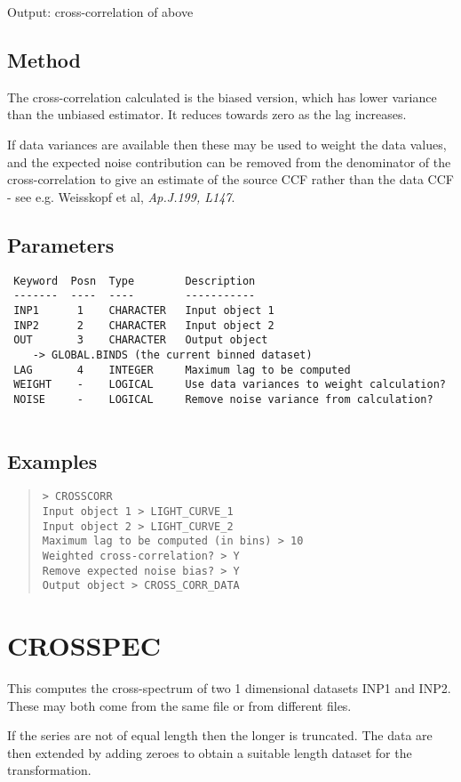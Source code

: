 \documentclass{book}
\renewcommand{\_}{{\tt\char'137}}     %
\begin{document}
Output: cross-correlation of above
 
\subsection{Method}
The cross-correlation calculated is the biased version, which has
lower variance than the unbiased estimator. It reduces towards
zero as the lag increases.
 
If data variances are available then these may be used to weight
the data values, and the expected noise contribution can be
removed from the denominator of the cross-correlation to give an
estimate of the source CCF rather than the data CCF - see e.g.
Weisskopf et al, {\em Ap.J.199, L147}.
\subsection{Parameters}
\begin{verbatim}
 Keyword  Posn  Type        Description
 -------  ----  ----        -----------
 INP1      1    CHARACTER   Input object 1
 INP2      2    CHARACTER   Input object 2
 OUT       3    CHARACTER   Output object
    -> GLOBAL.BINDS (the current binned dataset)
 LAG       4    INTEGER     Maximum lag to be computed
 WEIGHT    -    LOGICAL     Use data variances to weight calculation?
 NOISE     -    LOGICAL     Remove noise variance from calculation?
 
\end{verbatim}\subsection{Examples}
\begin{quote}\begin{verbatim}
> CROSSCORR
Input object 1 > LIGHT_CURVE_1
Input object 2 > LIGHT_CURVE_2
Maximum lag to be computed (in bins) > 10
Weighted cross-correlation? > Y
Remove expected noise bias? > Y
Output object > CROSS_CORR_DATA
\end{verbatim}\end{quote}
\section{CROSSPEC}
This computes the cross-spectrum of two 1 dimensional datasets
INP1 and INP2. These may both come from the same file or from
different files.
 
If the series are not of equal length then the longer is
truncated. The data are then extended by adding zeroes to obtain
a suitable length dataset for the transformation.
 
\end{document}
